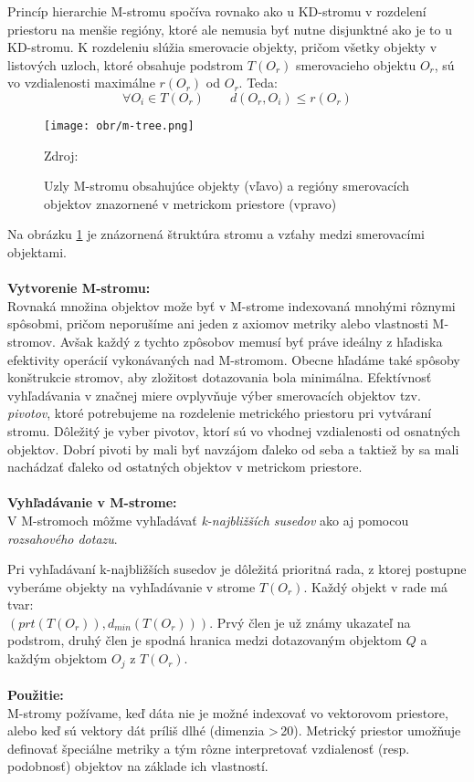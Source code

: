 \documentclass[12pt,oneside]{fithesis2}
\begin{document}
Princíp hierarchie M-stromu spočíva rovnako ako u KD-stromu v rozdelení priestoru na menšie regióny, ktoré ale nemusia byť nutne disjunktné ako je to u KD-stromu. K rozdeleniu slúžia smerovacie objekty, pričom všetky objekty v listových uzloch, ktoré obsahuje podstrom $T(O_r)$ smerovacieho objektu $O_r$, sú vo vzdialenosti maximálne $r(O_r)$ od $O_r$. Teda:
\begin{equation*}
\forall O_i \in T(O_r) \qquad   d(O_r,O_i) \leq r(O_r)
\end{equation*}
\begin{figure}
  		\centering
  		\texttt{[image: obr/m-tree.png]}
  		\caption{Uzly M-stromu obsahujúce objekty (vľavo) a regióny smerovacích objektov znazornené v metrickom priestore (vpravo)} Zdroj: 
  		\label{m-strom}
\end{figure}
Na obrázku \ref{m-strom} je znázornená štruktúra stromu a vzťahy medzi smerovacími objektami.\\
\\
\textbf{Vytvorenie M-stromu:}\\
Rovnaká množina objektov može byť v M-strome indexovaná mnohými rôznymi spôsobmi, pričom neporušíme ani jeden z axiomov metriky alebo vlastnosti M-stromov. Avšak každý z tychto zpôsobov memusí byť práve ideálny z hľadiska efektivity operácií vykonávaných nad M-stromom. Obecne hľadáme také spôsoby konštrukcie stromov, aby zložitost dotazovania bola minimálna. Efektívnosť vyhľadávania v značnej miere ovplyvňuje výber smerovacích objektov tzv. \textit{pivotov}, ktoré potrebujeme na rozdelenie metrického priestoru pri vytváraní stromu. Dôležitý je vyber pivotov, ktorí sú vo vhodnej vzdialenosti od osnatných objektov. Dobrí pivoti by mali byť navzájom ďaleko od seba a taktiež by sa mali nachádzať ďaleko od ostatných objektov v metrickom priestore. \\
\\
\textbf{Vyhľadávanie v M-strome:}\\
V M-stromoch môžme vyhľadávať \textit{k-najbližších susedov} ako aj pomocou \textit{rozsahového dotazu}. 

Pri vyhľadávaní k-najbližších susedov je dôležitá prioritná rada, z ktorej postupne vyberáme objekty na vyhľadávanie v strome $T(O_r)$. Každý objekt v rade má tvar:\\ $(prt(T(O_r)), d_{min}(T(O_r)))$. Prvý člen je už známy ukazateľ na podstrom, druhý člen je spodná hranica medzi dotazovaným objektom $Q$ a každým objektom $O_j$ z $T(O_r)$.
\\ \\
\textbf{Použitie:} \\
M-stromy požívame, keď dáta nie je možné indexovať vo vektorovom priestore, alebo keď sú vektory dát príliš dlhé (dimenzia \textgreater \,20). Metrický priestor umožňuje definovať špeciálne metriky a tým rôzne interpretovať vzdialenosť (resp. podobnosť) objektov na základe ich vlastností.
\end{document}
